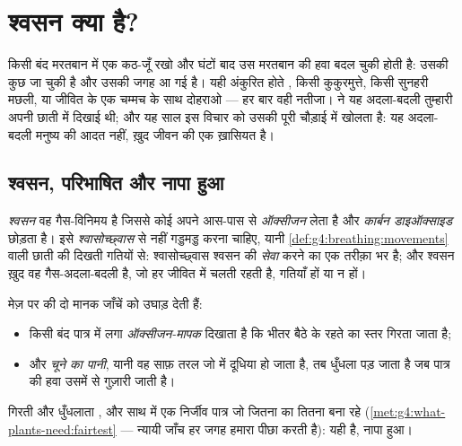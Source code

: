 \chapter{श्वसन क्या है?}\label{ch:g7:what-is-respiration}

किसी बंद मरतबान में एक कठ-जूँ रखो और घंटों बाद उस मरतबान की हवा बदल चुकी
होती है: उसकी कुछ  जा चुकी है और उसकी जगह  आ गई
है। यही अंकुरित होते , किसी कुकुरमुत्ते, किसी सुनहरी मछली, या जीवित
 के एक चम्मच के साथ दोहराओ --- हर बार वही नतीजा।
 ने यह अदला-बदली तुम्हारी अपनी छाती में
दिखाई थी; और यह साल इस विचार को उसकी पूरी चौड़ाई में खोलता है: यह
अदला-बदली मनुष्य की आदत नहीं, ख़ुद जीवन की एक ख़ासियत है।

\section{श्वसन, परिभाषित और नापा हुआ}

\begin{definition}[श्वसन]\label{def:g7:what-is-respiration:respiration}
\emph{श्वसन} वह गैस-विनिमय है जिससे कोई  अपने आस-पास से
\emph{ऑक्सीजन} लेता है और \emph{कार्बन
डाइऑक्साइड} छोड़ता है। इसे
\emph{श्वासोच्छ्वास} से नहीं गड्डमड्ड करना चाहिए,
यानी \cref{def:g4:breathing:movements} वाली छाती की दिखती गतियों से:
श्वासोच्छ्वास श्वसन की \emph{सेवा} करने का एक तरीक़ा भर है; और श्वसन
ख़ुद वह गैस-अदला-बदली है, जो हर जीवित  में चलती रहती है, गतियाँ
हों या न हों।
\end{definition}

\begin{proposition}\label{prop:g7:what-is-respiration:shown}
मेज़ पर की दो मानक जाँचें  को उघाड़ देती हैं:
\begin{itemize}
  \item किसी बंद पात्र में लगा \emph{ऑक्सीजन-मापक} दिखाता है कि भीतर
        बैठे  के रहते  का स्तर गिरता जाता है;
  \item और \emph{चूने का पानी}, यानी वह साफ़ तरल जो
         में दूधिया हो जाता है, तब धुँधला पड़ जाता है
        जब पात्र की हवा उसमें से गुज़ारी जाती है।
\end{itemize}
गिरती  और धुँधलाता , और साथ में एक निर्जीव 
पात्र जो जितना का तितना बना रहे
(\cref{met:g4:what-plants-need:fairtest} --- न्यायी जाँच हर जगह हमारा
पीछा करती है): यही  है, नापा हुआ।
\end{proposition}
\admitted

